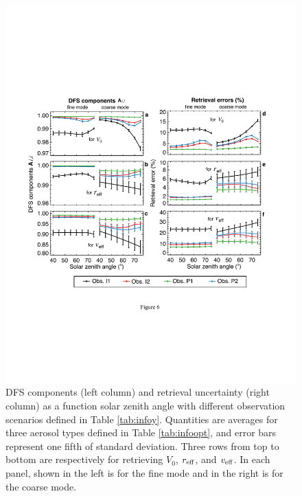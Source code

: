 \begin{figure}[t]
  \centering
  \includegraphics[width={\textwidth}]{figures/info06.pdf}
  \caption{DFS components (left column) and retrieval uncertainty (right
column) as a function solar zenith angle with different observation scenarios
defined in Table \ref{tab:infoy}. Quantities are averages for three aerosol 
types defined in Table \ref{tab:infoopt}, and error bars represent 
one fifth of standard deviation. Three rows from top to bottom are 
respectively for retrieving $V_0$, $r_\text{eff}$, and $v_\text{eff}$. In
each panel, shown in the left is for the fine mode and in the right is for the
coarse mode.}
  \label{fig:infodfspsd1}
\end{figure}

